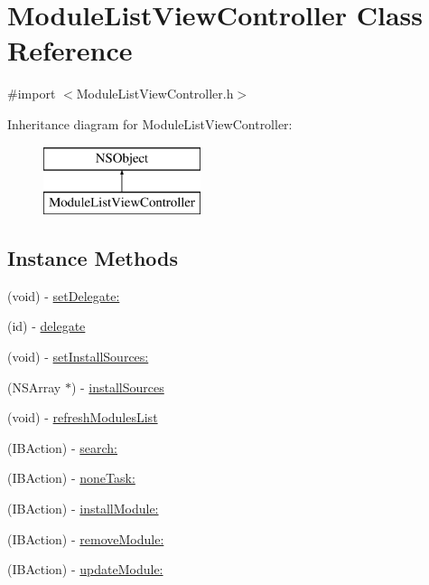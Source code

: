 \hypertarget{interface_module_list_view_controller}{\section{Module\-List\-View\-Controller Class Reference}
\label{interface_module_list_view_controller}
}


{\ttfamily \#import $<$Module\-List\-View\-Controller.\-h$>$}

Inheritance diagram for Module\-List\-View\-Controller\-:\begin{figure}[H]
\begin{center}
\leavevmode
\includegraphics[height=2.000000cm]{interface_module_list_view_controller}
\end{center}
\end{figure}
\subsection*{Instance Methods}
\begin{DoxyCompactItemize}
\item 
(void) -\/ \hyperlink{interface_module_list_view_controller_a897d6f5486a6100c017c9cfdf31941fd}{set\-Delegate\-:}
\item 
(id) -\/ \hyperlink{interface_module_list_view_controller_a6c98e239b6ba279cfc95c64db9de555c}{delegate}
\item 
(void) -\/ \hyperlink{interface_module_list_view_controller_a16bff9e919181c8b344fd78c35bbf96c}{set\-Install\-Sources\-:}
\item 
(N\-S\-Array $\ast$) -\/ \hyperlink{interface_module_list_view_controller_a11e9988f5938a509ce207fbd7f308237}{install\-Sources}
\item 
(void) -\/ \hyperlink{interface_module_list_view_controller_af7de1616045adf3cd23a42e2e9031c45}{refresh\-Modules\-List}
\item 
(I\-B\-Action) -\/ \hyperlink{interface_module_list_view_controller_a38fb29b3033369f3eb19233060c9135d}{search\-:}
\item 
(I\-B\-Action) -\/ \hyperlink{interface_module_list_view_controller_a19898f3a83d5c0f0172c3e87dd317bfb}{none\-Task\-:}
\item 
(I\-B\-Action) -\/ \hyperlink{interface_module_list_view_controller_a5b27c27b85c503c117801a792e207815}{install\-Module\-:}
\item 
(I\-B\-Action) -\/ \hyperlink{interface_module_list_view_controller_aecf9e6bd6004ac6d6e0467718a88514a}{remove\-Module\-:}
\item 
(I\-B\-Action) -\/ \hyperlink{interface_module_list_view_controller_a8fac8758bf95a6330f1f4d7194716669}{update\-Module\-:}
\end{DoxyCompactItemize}
